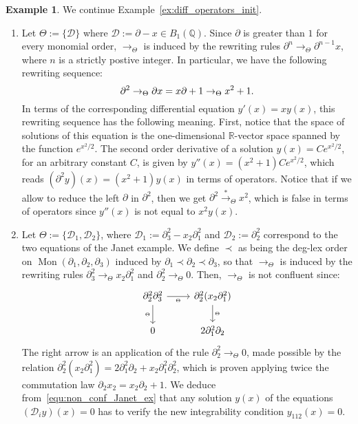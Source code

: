\documentclass[10pt]{easychair}
\theoremstyle{definition}
\newtheorem{example}[theorem]{Example}
\newcommand\D{\mathcal{D}}
\newcommand\Q{\mathbb{Q}}
\newcommand\R{\mathbb{R}}
\newcommand\Weyl[1]{B_{#1}(\Q)}
\DeclareMathOperator{\Mon}{Mon}
\newcommand\transTheta{\overset{*}{\to}_\Theta}
\newcommand\rewTheta{\to_\Theta}
\begin{document}
\begin{example}\label{ex:diff_operators_rew}
  We continue Example~\ref{ex:diff_operators_init}.
  \begin{enumerate}
  \item\label{it:ODE_rew} Let $\Theta:=\{\D\}$ where
    $\D:=\partial-x\in\Weyl{1}$. Since $\partial$ is greater than $1$ for
    every monomial order, $\rewTheta$ is induced by the rewriting rules
    $\partial^n\rewTheta \partial^{n-1}x$, where $n$ is a strictly
    postive integer. In particular, we have the following rewriting
    sequence:
    \[\partial^2\rewTheta\partial x=x\partial+1\rewTheta x^2+1.
    \smallskip\]
    In terms of the corresponding differential equation $y'(x)=xy(x)$,
    this rewriting sequence has the following meaning. First, notice that
    the space of solutions of this equation is the one-dimensional
    $\R$-vector space spanned by the function $e^{x^2/2}$. The second
    order derivative of a solution $y(x)=Ce^{x^2/2}$, for an arbitrary
    constant $C$, is given by $y''(x)=(x^2+1)Ce^{x^2/2}$, which reads
    $(\partial^2y)(x)=(x^2+1)y(x)$ in terms of operators. Notice that if
    we allow to reduce the left $\partial$ in $\partial^2$, then we get
    $\partial^2\transTheta x^2$, which is false in terms of operators
    since $y''(x)$ is not equal to $x^2y(x)$.
  \item\label{it:Janet_example_rew} Let $\Theta:=\{\D_1,\D_2\}$, where
    $\D_1:=\partial_3^2-x_2\partial_1^2$ and $\D_2:=\partial_2^2$
    correspond to the two equations of the Janet example. We define
    $\prec$ as being the deg-lex order on
    $\Mon(\partial_1,\partial_2,\partial_3)$ induced by
    $\partial_1\prec\partial_2\prec\partial_3$, so that $\rewTheta$ is
    induced by the rewriting rules
    $\partial_3^2\rewTheta x_2\partial_1^2$ and
    $\partial_2^2\rewTheta 0$. Then, $\rewTheta$ is not confluent since:
    \begin{equation}\label{equ:non_conf_Janet_ex}
      \begin{tikzcd}
        \partial_2^2\partial_3^2\ar[d, "_\Theta"']\ar[r, "_\Theta"'] &
        \partial_2^2(x_2\partial_1^2)\ar[d, "_\Theta"]\\
        0 & 2\partial_1^2\partial_2
      \end{tikzcd}
    \end{equation}
    The right arrow is an application of the rule $\partial_2^2 \rewTheta 0$, made
    possible by the relation
    $\partial_2^2(x_2\partial_1^2)=2 \partial_1^2\partial_2+x_2\partial_1^2\partial_2^2$, which is proven applying twice
    the commutation law $\partial_2x_2=x_2\partial_2+1$.  We deduce
    from~\eqref{equ:non_conf_Janet_ex} that any solution $y(x)$ of the equations
    $(\D_iy)(x)=0$ has to verify the new integrability condition $y_{112}(x)=0$.
  \end{enumerate}
\end{example}
\smallskip
\end{document}
